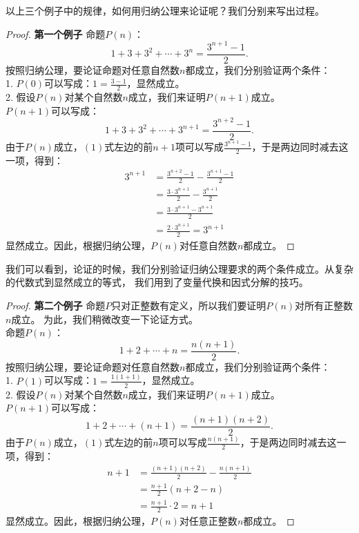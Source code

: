 以上三个例子中的规律，如何用归纳公理来论证呢？我们分别来写出过程。
\begin{proof}{\textbf{第一个例子 }}
    命题$P(n)$：
    $$ 1 + 3 + 3^2 + \cdots + 3^n = \frac{3^{n+1} - 1}{2}. $$
    按照归纳公理，要论证命题对任意自然数$n$都成立，我们分别验证两个条件：\\
    1. $P(0)$可以写成：$1 = \frac{3 - 1}{2}$，显然成立。\\
    2. 假设$P(n)$对某个自然数$n$成立，我们来证明$P(n+1)$成立。\\
    $P(n+1)$可以写成：
    $$ 1 + 3 + 3^2 + \cdots + 3^{n+1} = \frac{3^{n+2} - 1}{2}. $$
    由于$P(n)$成立，$(1)$式左边的前$n+1$项可以写成$\frac{3^{n+1} - 1}{2}$，于是两边同时减去这一项，得到：
    \begin{align*}
        3^{n+1} &= \frac{3^{n+2} - 1}{2} - \frac{3^{n+1} - 1}{2}  \\
        &= \frac{3\cdot 3^{n+1}}{2} - \frac{3^{n+1}}{2}  \\
        &= \frac{3\cdot 3^{n+1} - 3^{n+1}}{2}  \\
        &= \frac{2 \cdot 3^{n+1}}{2} = 3^{n+1} 
    \end{align*}
    显然成立。因此，根据归纳公理，$P(n)$对任意自然数$n$都成立。    
\end{proof}

我们可以看到，论证的时候，我们分别验证归纳公理要求的两个条件成立。从复杂的代数式到显然成立的等式，
我们用到了变量代换和因式分解的技巧。

\begin{proof}{\textbf{第二个例子 }}
    命题$P$只对正整数有定义，所以我们要证明$P(n)$对所有正整数$n$成立。
    为此，我们稍微改变一下论证方式。\\
    命题$P(n)$：
    $$ 1 + 2 + \cdots + n = \frac{n(n+1)}{2}. $$
    按照归纳公理，要论证命题对任意自然数$n$都成立，我们分别验证两个条件：\\
    1. $P(1)$可以写成：$1 = \frac{1(1+1)}{2}$，显然成立。\\
    2. 假设$P(n)$对某个自然数$n$成立，我们来证明$P(n+1)$成立。\\
    $P(n+1)$可以写成：
    $$ 1 + 2 + \cdots + (n+1) = \frac{(n+1)(n+2)}{2}.  $$
    由于$P(n)$成立，$(1)$式左边的前$n$项可以写成$\frac{n(n+1)}{2}$，于是两边同时减去这一项，得到：
    \begin{align*}
        n+1 &= \frac{(n+1)(n+2)}{2} - \frac{n(n+1)}{2}  \\
        &= \frac{n+1}{2}\left(n+2 - n\right)  \\
        &= \frac{n+1}{2} \cdot 2 = n+1 
    \end{align*}
    显然成立。因此，根据归纳公理，$P(n)$对任意正整数$n$都成立。    
\end{proof}

